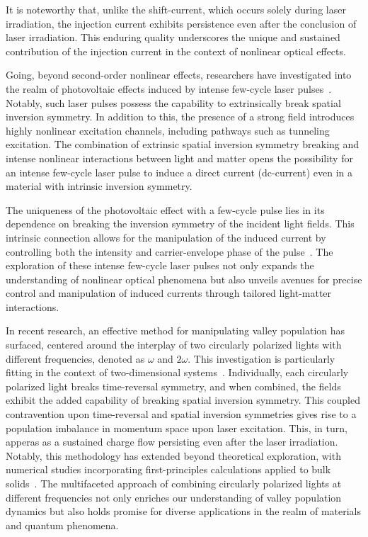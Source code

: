 It is noteworthy that, unlike the shift-current, which occurs solely during laser irradiation, the injection current exhibits persistence even after the conclusion of laser irradiation. This enduring quality underscores the unique and sustained contribution of the injection current in the context of nonlinear optical effects.

Going, beyond second-order nonlinear effects, researchers have investigated into the realm of
photovoltaic effects induced by intense few-cycle laser
pulses~\cite{Schiffrin2013,PhysRevLett.113.087401,PhysRevLett.116.057401,Higuchi2017,Heide_2020,Morimoto_2022}.
Notably, such laser pulses possess the capability to extrinsically break spatial inversion
symmetry. In addition to this, the presence of a strong field introduces highly nonlinear
excitation channels, including pathways such as tunneling excitation. The combination of extrinsic spatial inversion symmetry breaking and intense nonlinear interactions between light and matter opens the possibility for an intense few-cycle laser pulse to induce a direct current (dc-current) even in a material with intrinsic inversion symmetry.


The uniqueness of the photovoltaic effect with a few-cycle pulse lies in its dependence on breaking the inversion symmetry of the incident light fields. This intrinsic connection allows for the manipulation of the induced current by controlling both the intensity and carrier-envelope phase of the pulse~\cite{Schiffrin2013,Higuchi2017}. The exploration of these intense few-cycle laser pulses not only expands the understanding of nonlinear optical phenomena but also unveils avenues for precise control and manipulation of induced currents through tailored light-matter interactions.


In recent research, an effective method for manipulating valley population has surfaced, centered
around the interplay of two circularly polarized lights with different frequencies, denoted as
$\omega$ and $2\omega$. This investigation is particularly fitting in the context of
two-dimensional systems~\cite{Jimenez-Galan2020,Mrudul:21}. Individually, each circularly polarized
light breaks time-reversal symmetry, and when combined, the fields exhibit the added capability of
breaking spatial inversion symmetry. This coupled contravention upon time-reversal and spatial
inversion symmetries gives rise to a population imbalance in momentum space upon laser excitation.
This, in turn, apperas as a sustained charge flow persisting even after the laser irradiation. Notably, this methodology has extended beyond theoretical exploration, with numerical studies incorporating first-principles calculations applied to bulk solids~\cite{PhysRevLett.127.126601}. The multifaceted approach of combining circularly polarized lights at different frequencies not only enriches our understanding of valley population dynamics but also holds promise for diverse applications in the realm of materials and quantum phenomena.
